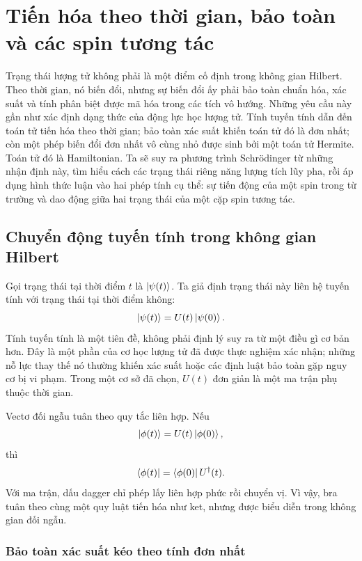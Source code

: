 \chapter{Tiến hóa theo thời gian, bảo toàn và các spin tương tác}

Trạng thái lượng tử không phải là một điểm cố định trong không gian Hilbert. Theo thời gian, nó biến đổi, nhưng sự biến đổi ấy phải bảo toàn chuẩn hóa, xác suất và tính phân biệt được mã hóa trong các tích vô hướng. Những yêu cầu này gần như xác định dạng thức của động lực học lượng tử. Tính tuyến tính dẫn đến toán tử tiến hóa theo thời gian; bảo toàn xác suất khiến toán tử đó là đơn nhất; còn một phép biến đổi đơn nhất vô cùng nhỏ được sinh bởi một toán tử Hermite. Toán tử đó là Hamiltonian. Ta sẽ suy ra phương trình Schr\"odinger từ những nhận định này, tìm hiểu cách các trạng thái riêng năng lượng tích lũy pha, rồi áp dụng hình thức luận vào hai phép tính cụ thể: sự tiến động của một spin trong từ trường và dao động giữa hai trạng thái của một cặp spin tương tác.

\section{Chuyển động tuyến tính trong không gian Hilbert}

Gọi trạng thái tại thời điểm \(t\) là \(\left\lvert\psi(t)\right\rangle\). Ta giả định trạng thái này liên hệ tuyến tính với trạng thái tại thời điểm không:
\begin{equation}
\left\lvert\psi(t)\right\rangle=U(t)\left\lvert\psi(0)\right\rangle.
\end{equation}
Tính tuyến tính là một tiên đề, không phải định lý suy ra từ một điều gì cơ bản hơn. Đây là một phần của cơ học lượng tử đã được thực nghiệm xác nhận; những nỗ lực thay thế nó thường khiến xác suất hoặc các định luật bảo toàn gặp nguy cơ bị vi phạm. Trong một cơ sở đã chọn, \(U(t)\) đơn giản là một ma trận phụ thuộc thời gian.

Vectơ đối ngẫu tuân theo quy tắc liên hợp. Nếu
\begin{equation}
\left\lvert\phi(t)\right\rangle=U(t)\left\lvert\phi(0)\right\rangle,
\end{equation}
thì
\begin{equation}
\left\langle\phi(t)\right\rvert=\left\langle\phi(0)\right\rvert U^\dagger(t).
\end{equation}
Với ma trận, dấu dagger chỉ phép lấy liên hợp phức rồi chuyển vị. Vì vậy, bra tuân theo cùng một quy luật tiến hóa như ket, nhưng được biểu diễn trong không gian đối ngẫu.

\subsection{Bảo toàn xác suất kéo theo tính đơn nhất}

